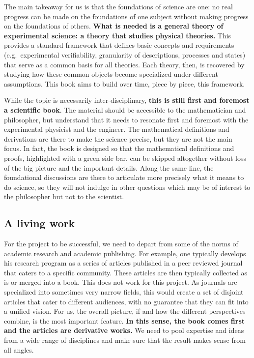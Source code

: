 \documentclass[11pt,letterpaper,fleqn]{memoir} %
\begin{document}
The main takeaway for us is that the foundations of science are one: no real progress can be made on the foundations of one subject without making progress on the foundations of others. \textbf{What is needed is a general theory of experimental science: a theory that studies physical theories.} This provides a standard framework that defines basic concepts and requirements (e.g.~experimental verifiability, granularity of descriptions, processes and states) that serve as a common basis for all theories. Each theory, then, is recovered by studying how these common objects become specialized under different assumptions. This book aims to build over time, piece by piece, this framework.

While the topic is necessarily inter-disciplinary, \textbf{this is still first and foremost a scientific book}. The material should be accessible to the mathematician and philosopher, but understand that it needs to resonate first and foremost with the experimental physicist and the engineer. The mathematical definitions and derivations are there to make the science precise, but they are not the main focus. In fact, the book is designed so that the mathematical definitions and proofs, highlighted with a green side bar, can be skipped altogether without loss of the big picture and the important details. Along the same line, the foundational discussions are there to articulate more precisely what it means to do science, so they will not indulge in other questions which may be of interest to the philosopher but not to the scientist.

\subsection{A living work}

For the project to be successful, we need to depart from some of the norms of academic research and academic publishing. For example, one typically develops his research program as a series of articles published in a peer reviewed journal that caters to a specific community. These articles are then typically collected as is or merged into a book. This does not work for this project. As journals are specialized into sometimes very narrow fields, this would create a set of disjoint articles that cater to different audiences, with no guarantee that they can fit into a unified vision. For us, the overall picture, if and how the different perspectives combine, is the most important feature. \textbf{In this sense, the book comes first and the articles are derivative works.} We need to pool expertise and ideas from a wide range of disciplines and make sure that the result makes sense from all angles.
\end{document}
